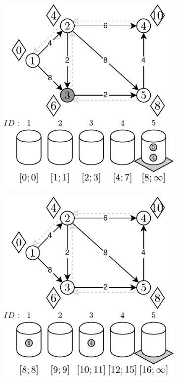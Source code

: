 \begin{figure}[!htbp]
\begin{subfigure}[b]{0.3\textwidth}
		\caption{}
	\end{subfigure}
	\begin{subfigure}[b]{0.3\textwidth}
		\includegraphics[width=\textwidth]{Chapter_II/8/d.pdf}
		\caption{}
	\end{subfigure}
	\begin{subfigure}[b]{0.3\textwidth}
		\includegraphics[width=\textwidth]{Chapter_II/8/e.pdf}

\end{subfigure}
\end{figure}

